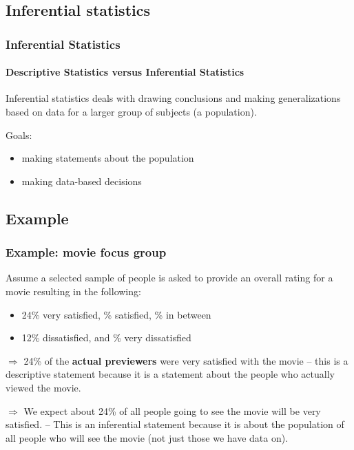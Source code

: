 \documentclass[handout]{beamer}
\begin{document}
\subsection{Inferential statistics}
\begin{frame}
\frametitle{Inferential Statistics}
\framesubtitle{Descriptive Statistics versus Inferential Statistics}

\begin{definition}
\alert{Inferential statistics} deals with drawing conclusions and making
generalizations based on data for a larger group of subjects (a population).
\end{definition}

\vspace{0.1in} \pause

Goals:
\begin{itemize}
\item making statements about the population
\item making data-based decisions
\end{itemize}
\end{frame}




\subsection{Example}
\begin{frame}
\frametitle{Example: movie focus group}

Assume a selected sample of people is asked to provide an
overall rating for a movie resulting in the following:
\begin{itemize}
\item 24\% very satisfied, \% satisfied, \% in between
\item[] 12\% dissatisfied, and \% very dissatisfied
\end{itemize}
\vspace{.25cm} 

$\Rightarrow$ 24\% of the \textbf{actual previewers}
were very satisfied with
the movie -- this is a \alert{descriptive statement} 
\pause 
because it is a statement about the people who actually viewed the movie.

$\Rightarrow$ We expect about 24\% of \alert{all people} going to see the movie will be very satisfied.  
-- This is an \alert{inferential statement} because it is about the population of 
all people who will see the movie (not just those we have data on).
\end{frame}
\end{document}
